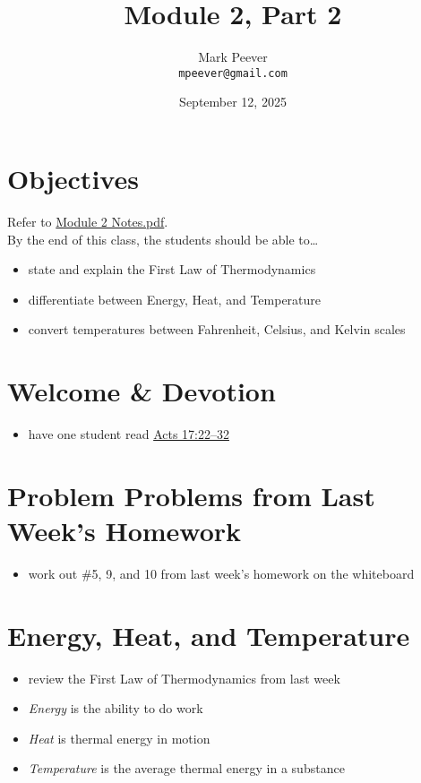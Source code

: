 \documentclass[10pt, oneside]{article}   	%
\title{Module 2, Part 2}
\author{Mark Peever\\ \texttt{mpeever@gmail.com}}
\date{September 12, 2025}
\begin{document}
\maketitle

\section*{Objectives}
Refer to \href{https://drive.google.com/file/d/1lXFrIbob_UusJJQ4y8gLQMyNPjURZ2zt/view?usp=drive_link}{Module 2 Notes.pdf}.\\

By the end of this class, the students should be able to\ldots
\begin{itemize}
\item state and explain the First Law of Thermodynamics
\item differentiate between Energy, Heat, and Temperature
\item convert temperatures between Fahrenheit, Celsius, and Kelvin scales
\end{itemize}

\section*{Welcome \& Devotion}
\begin{itemize}
\item have one student read \href{https://tinyurl.com/26k8csmf}{Acts 17:22–32}
\end{itemize}

\section*{Problem Problems from Last Week's Homework}
\begin{itemize}
\item work out \#5, 9, and 10 from last week's homework on the whiteboard
\end{itemize}

\section*{Energy, Heat, and Temperature}
\begin{itemize}
\item review the First Law of Thermodynamics from last week
\item \emph{Energy} is the ability to do work
\item \emph{Heat} is thermal energy in motion
\item \emph{Temperature} is the average thermal energy in a substance
\end{itemize}
\end{document}
